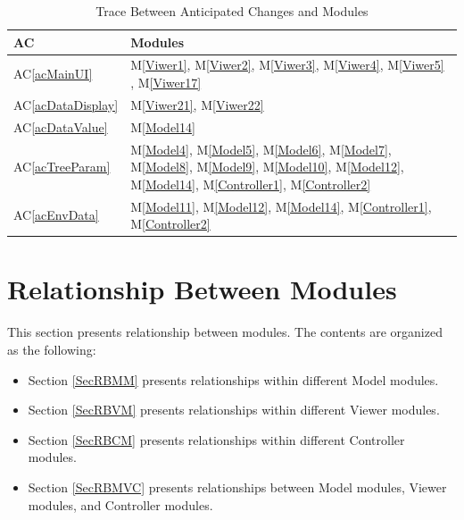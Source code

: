 \documentclass[12pt, titlepage]{article}
\newcommand{\acref}[1]{AC\ref{#1}}
\newcommand{\mref}[1]{M\ref{#1}}
\begin{document}
\newpage

\begin{table}[H]
\caption{Trace Between Anticipated Changes and Modules}
\label{TblACT}

\centering
\begin{tabular}{p{} p{}}
\toprule
\textbf{AC} & \textbf{Modules}\\
\midrule
\acref{acMainUI} & \mref{Viwer1}, \mref{Viwer2}, \mref{Viwer3}, \mref{Viwer4}, \mref{Viwer5}
, \mref{Viwer17}\\

\acref{acDataDisplay} & \mref{Viwer21}, \mref{Viwer22}\\

\acref{acDataValue} & \mref{Model14}\\

\acref{acTreeParam} & \mref{Model4}, \mref{Model5}, \mref{Model6}, \mref{Model7},
\mref{Model8}, \mref{Model9}, \mref{Model10}, \mref{Model12}, \mref{Model14}, 
\mref{Controller1}, \mref{Controller2}\\

\acref{acEnvData} &  \mref{Model11}, \mref{Model12}, \mref{Model14}, \mref{Controller1},
 \mref{Controller2}\\

\bottomrule
\end{tabular}
\end{table}

\newpage

\section{Relationship Between Modules} \label{SecUse}

This section presents relationship between modules. The contents are organized as the 
following:
\begin{itemize}
\item Section \ref{SecRBMM} presents relationships within different Model modules.
\item Section \ref{SecRBVM} presents relationships within different Viewer modules.
\item Section \ref{SecRBCM} presents relationships within different Controller modules.
\item Section \ref{SecRBMVC} presents relationships between Model modules, Viewer modules, 
and Controller modules.
\end{itemize}
\end{document}
